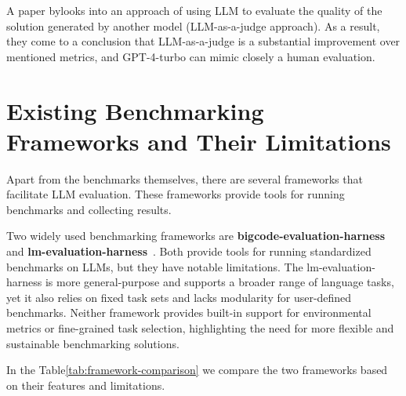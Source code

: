 A paper by\cite{crupi2025effectiveness}looks into an approach of using LLM to evaluate the quality of the solution generated by another model (LLM-as-a-judge approach).
As a result, they come to a conclusion that LLM-as-a-judge is a substantial improvement over mentioned metrics, and GPT-4-turbo can mimic closely a human evaluation.


\section{Existing Benchmarking Frameworks and Their Limitations}

Apart from the benchmarks themselves, there are several frameworks that facilitate LLM evaluation.
These frameworks provide tools for running benchmarks and collecting results.

Two widely used benchmarking frameworks are \textbf{bigcode-evaluation-harness}~\cite{bigcode-evaluation-harness} and \textbf{lm-evaluation-harness}~\cite{githubGitHubEleutherAIlmevaluationharness}.
Both provide tools for running standardized benchmarks on LLMs, but they have notable limitations.
The lm-evaluation-harness is more general-purpose and supports a broader range of language tasks, yet it also relies on fixed task sets and lacks modularity for user-defined benchmarks.
Neither framework provides built-in support for environmental metrics or fine-grained task selection, highlighting the need for more flexible and sustainable benchmarking solutions.

In the Table\ref{tab:framework-comparison} we compare the two frameworks based on their features and limitations.

